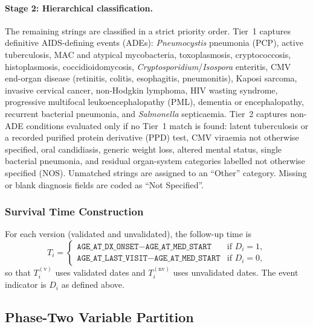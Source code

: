 \paragraph{Stage 2: Hierarchical classification.}
The remaining strings are classified in a strict priority order. Tier~1 captures definitive AIDS-defining events (ADEs): \textit{Pneumocystis} pneumonia (PCP), active tuberculosis, MAC and atypical mycobacteria, toxoplasmosis, cryptococcosis, histoplasmosis, coccidioidomycosis, \textit{Cryptosporidium}/\textit{Isospora} enteritis, CMV end-organ disease (retinitis, colitis, esophagitis, pneumonitis), Kaposi sarcoma, invasive cervical cancer, non-Hodgkin lymphoma, HIV wasting syndrome, progressive multifocal leukoencephalopathy (PML), dementia or encephalopathy, recurrent bacterial pneumonia, and \textit{Salmonella} septicaemia. Tier~2 captures non-ADE conditions evaluated only if no Tier~1 match is found: latent tuberculosis or a recorded purified protein derivative (PPD) test, CMV viraemia not otherwise specified, oral candidiasis, generic weight loss, altered mental status, single bacterial pneumonia, and residual organ-system categories labelled not otherwise specified (NOS). Unmatched strings are assigned to an ``Other'' category. Missing or blank diagnosis fields are coded as ``Not Specified''.

\subsubsection{Survival Time Construction}

For each version (validated and unvalidated), the follow-up time is
\begin{equation*}
    T_i = \begin{cases}
        \texttt{AGE\_AT\_DX\_ONSET} - \texttt{AGE\_AT\_MED\_START}
            & \text{if } D_i = 1, \\
        \texttt{AGE\_AT\_LAST\_VISIT} - \texttt{AGE\_AT\_MED\_START}
            & \text{if } D_i = 0,
    \end{cases}
\end{equation*}
so that $T_i^{(\mathrm{v})}$ uses validated dates and $T_i^{(\mathrm{nv})}$ uses unvalidated dates. The event indicator is $D_i$ as defined above.

\subsection{Phase-Two Variable Partition}
\label{app:vccc_partition}

